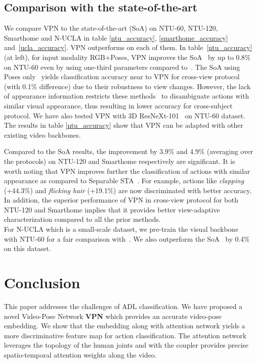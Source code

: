 \documentclass[runningheads]{llncs}
\begin{document}
\subsection{Comparison with the state-of-the-art}
We compare VPN to the state-of-the-art (SoA) on NTU-60, NTU-120, Smarthome and N-UCLA in table \ref{ntu_accuracy}, \ref{smarthome_accuracy} and~\ref{ucla_accuracy}. VPN outperforms on each of them. In table~\ref{ntu_accuracy} (at left), for input modality RGB+Poses, VPN improves the SoA~\cite{spatial-i3d} by up to 0.8\% on NTU-60 even by using one-third parameters compared to~\cite{spatial-i3d}. The SoA using Poses only~\cite{directed_graph} yields classification accuracy near to VPN for cross-view protocol (with 0.1\% difference) due to their robustness to view changes. However, the lack of appearance information restricts these methods~\cite{directed_graph,skel_gcn_3} to disambiguate actions with similar visual appearance, thus resulting in lower accuracy for cross-subject protocol. We have also tested VPN with 3D ResNeXt-101~\cite{can_spatio-temporal} on NTU-60 dataset. The results in table \ref{ntu_accuracy} show that VPN can be adapted with other existing video backbones.

Compared to the SoA results, the improvement by 3.9\% and 4.9\% (averaging over the protocols) on NTU-120 and Smarthome respectively are significant.   It is worth noting that VPN improves further the classification of actions with similar appearance as compared to Separable STA~\cite{STA_iccv}. For example, actions like \textit{clapping} (+44.3\%) and \textit{flicking hair} (+19.1\%) are now discriminated with better accuracy. In addition, the superior performance of VPN in cross-view protocol for both NTU-120 and Smarthome implies that it provides better view-adaptive characterization compared to all the prior methods.\\
For N-UCLA which is a small-scale dataset, we pre-train the visual backbone with NTU-60 for a fair comparison with~\cite{glimpse,STA_iccv,spatial-i3d}. We also outperform the SoA~\cite{spatial-i3d} by 0.4\% on this dataset. 


\section{Conclusion}
This paper addresses the challenges of ADL classification. We have proposed a novel Video-Pose Network \textbf{VPN} which provides an accurate video-pose embedding. We show that the embedding along with attention network yields a more discriminative feature map for action classification. The attention network leverages the topology of the human joints and with the coupler provides precise spatio-temporal attention weights along the video.
\end{document}
